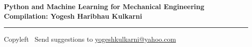 % 



% 


\graphicspath{{images/}}



\footnotesize


\begin{center}
\Large{\textbf{Python and Machine Learning for Mechanical Engineering\\ Compilation: Yogesh Haribhau Kulkarni}}  
\end{center}


\begin{multicols}{2}
	
\end{multicols}

\rule{\linewidth}{0.25pt}
\scriptsize
Copyleft \textcopyleft\  Send suggestions to 
\href{http://www.yogeshkulkarni.com}{yogeshkulkarni@yahoo.com}


